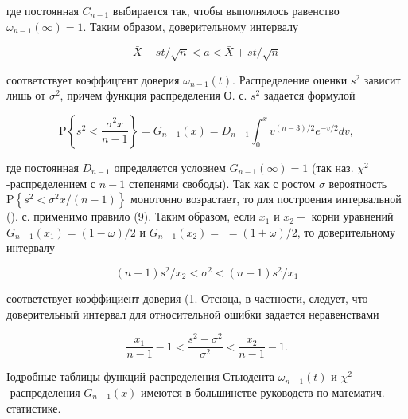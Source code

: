 \documentclass[10pt]{article}
\begin{document}
где постоянная $C_{n-1}$ выбирается так, чтобы выполнялось равенство $\omega_{n-1}(\infty)=1$. Таким образом, доверительному интервалу



\[

\bar{X}-s t / \sqrt{n}<a<\bar{X}+s t / \sqrt{n}

\]



соответствует коэффицгент доверия $\omega_{n-1}(t)$. Распределение оценки $s^{2}$ зависит лишь от $\sigma^{2}$, причем функция распределения О. с. $s^{2}$ задается формулоӥ



\[

\mathrm{P}\left\{s^{2}<\frac{\sigma^{2} x}{n-1}\right\}=G_{n-1}(x)=D_{n-1} \int_{0}^{x} v^{(n-3) / 2} e^{-v / 2} d v,

\]



где постоянная $D_{n-1}$ определяется условием $G_{n-1}(\infty)=1$ (так наз. $\chi^{2}$-распределением с $n-1$ степенями свободы). Так как с ростом $\sigma$ вероятность $\mathrm{P}\left\{s^{2}<\sigma^{2} x /(n-1)\right\}$ монотонно возрастает, то для построения интервальной (). с. применимо правило (9). Таким образом, если $x_{1}$ и $x_{2}-$ корни уравнений $G_{n-1}\left(x_{1}\right)=(1-\omega) / 2$ и $G_{n-1}\left(x_{2}\right)=$ $=(1+\omega) / 2$, то доверительному интервалу



\[

(n-1) s^{2} / x_{2}<\sigma^{2}<(n-1) s^{2} / x_{1}

\]



соответствует коэффициент доверия (1. Отсюца, в частности, следует, что доверительный интервал для относительной ошибки задается неравенствами



\[

\frac{x_{1}}{n-1}-1<\frac{s^{2}-\sigma^{2}}{\sigma^{2}}<\frac{x_{2}}{n-1}-1 .

\]



Іодробные таблицы функций распределения Стьюдента $\omega_{n-1}(t)$ и $\chi^{2}$-распределения $G_{n-1}(x)$ имеются в большинстве руководств по математич. статистике.
\end{document}
